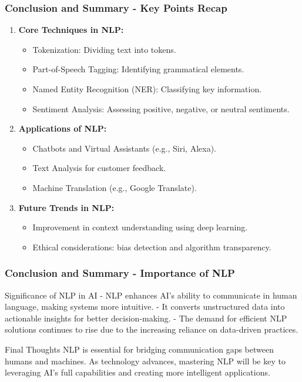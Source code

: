 \documentclass[aspectratio=169]{beamer}
\begin{document}
\begin{frame}[fragile]
    \frametitle{Conclusion and Summary - Key Points Recap}
    \begin{enumerate}
        \item \textbf{Core Techniques in NLP:}
        \begin{itemize}
            \item Tokenization: Dividing text into tokens.
            \item Part-of-Speech Tagging: Identifying grammatical elements.
            \item Named Entity Recognition (NER): Classifying key information.
            \item Sentiment Analysis: Assessing positive, negative, or neutral sentiments.
        \end{itemize}
        
        \item \textbf{Applications of NLP:}
        \begin{itemize}
            \item Chatbots and Virtual Assistants (e.g., Siri, Alexa).
            \item Text Analysis for customer feedback.
            \item Machine Translation (e.g., Google Translate).
        \end{itemize}
        
        \item \textbf{Future Trends in NLP:}
        \begin{itemize}
            \item Improvement in context understanding using deep learning.
            \item Ethical considerations: bias detection and algorithm transparency.
        \end{itemize}
    \end{enumerate}
\end{frame}

\begin{frame}[fragile]
    \frametitle{Conclusion and Summary - Importance of NLP}
    \begin{block}{Significance of NLP in AI}
        - NLP enhances AI's ability to communicate in human language, making systems more intuitive.
        - It converts unstructured data into actionable insights for better decision-making.
        - The demand for efficient NLP solutions continues to rise due to the increasing reliance on data-driven practices.
    \end{block}
    
    \begin{block}{Final Thoughts}
        NLP is essential for bridging communication gaps between humans and machines. As technology advances, mastering NLP will be key to leveraging AI's full capabilities and creating more intelligent applications.
    \end{block}
\end{frame}
\end{document}
